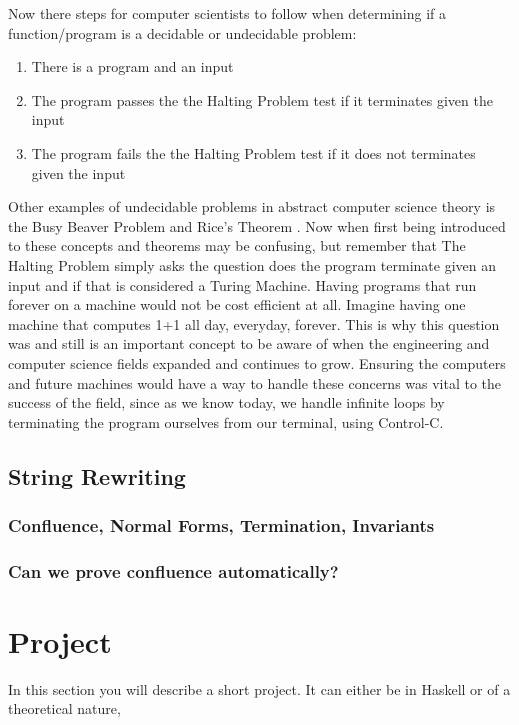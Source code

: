 \documentclass{article}
\begin{document}
\medskip\noindent
Now there steps for computer scientists to follow when determining if a function/program is a decidable or undecidable problem: 
\begin{enumerate}
    \item There is a program and an input
    \item The program passes the the Halting Problem test if it terminates given the input
    \item The program fails the the Halting Problem test if it does not terminates given the input
\end{enumerate}

\medskip\noindent
Other examples of undecidable problems in abstract computer science theory is the Busy Beaver Problem and Rice's Theorem \cite{Undecidable Problems}. Now when first being introduced to these concepts and theorems may be confusing, but remember that The Halting Problem simply asks the question does the program terminate given an input and if that is considered a Turing Machine. Having programs that run forever on a machine would not be cost efficient at all. Imagine having one machine that computes 1+1 all day, everyday, forever. This is why this question was and still is an important concept to be aware of when the engineering and computer science fields expanded and continues to grow. Ensuring the computers and future machines would have a way to handle these concerns was vital to the success of the field, since as we know today, we handle infinite loops by terminating the program ourselves from our terminal, using Control-C. 

\subsection{String Rewriting}

\subsubsection{Confluence, Normal Forms, Termination, Invariants}
\subsubsection{Can we prove confluence automatically?}

\section{Project}

In this section you will describe a short project. It can either be in Haskell or of a theoretical nature,
\end{document}
